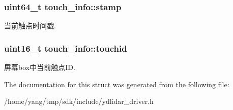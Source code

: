 \subsubsection[{\texorpdfstring{stamp}{stamp}}]{\setlength{\rightskip}{0pt plus 5cm}uint64\+\_\+t touch\+\_\+info\+::stamp}\hypertarget{structtouch__info_a6ee6ed6d0b734d51e32824e254be4866}{}\label{structtouch__info_a6ee6ed6d0b734d51e32824e254be4866}
当前触点时间戳. 
\subsubsection[{\texorpdfstring{touchid}{touchid}}]{\setlength{\rightskip}{0pt plus 5cm}uint16\+\_\+t touch\+\_\+info\+::touchid}\hypertarget{structtouch__info_a70be44e377e02cec5b4ecbb1c63f77dd}{}\label{structtouch__info_a70be44e377e02cec5b4ecbb1c63f77dd}
屏幕box中当前触点\+ID. 

The documentation for this struct was generated from the following file\+:\begin{DoxyCompactItemize}
\item 
/home/yang/tmp/sdk/include/ydlidar\+\_\+driver.\+h\end{DoxyCompactItemize}
